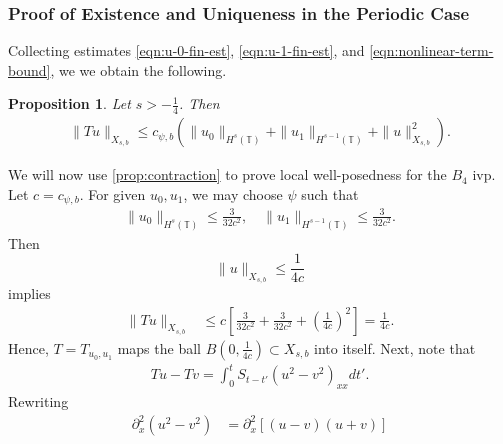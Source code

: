 \documentclass[12pt,reqno]{amsart}
\numberwithin{equation}{section}  %
\numberwithin{figure}{section}
\newcommand{\ci}{\mathbb{T}}
\newcommand{\p}{\partial}
\theoremstyle{plain}
\newtheorem{proposition}{Proposition}
\theoremstyle{definition}
\theoremstyle{remark}
\begin{document}
\subsubsection{Proof of Existence and Uniqueness in the Periodic Case}
\label{sssec:proof-b4-per-case}
%
%
Collecting estimates \eqref{eqn:u-0-fin-est}, \eqref{eqn:u-1-fin-est}, and
\eqref{eqn:nonlinear-term-bound}, we 
we obtain the following.
%
%				 
%
\begin{proposition}
\label{prop:contraction}
Let $s > -\frac{1}{4}$. Then
%
\begin{equation*}
	\begin{split}
    \|Tu\|_{X_{s,b}} \le c_{\psi, b} \left( \|u_0 \|_{H^s(\ci)} + \|u_1 \|_{H^{s-1}(\ci)}
    + \|u\|_{X_{s,b}}^2 
		\right).
	\end{split}
\end{equation*}
%
\end{proposition}
We will now use \autoref{prop:contraction} to prove local well-posedness for the 
$B_4$ ivp. Let $c = c_{\psi, b}$. For given $u_0, u_1$, we may choose $\psi$ such
that 
%
\begin{equation*}
	\begin{split}
    \|u_0\|_{H^s(\ci)} \le \frac{3}{32c^2}, \quad \|u_1\|_{H^{s-1}(\ci)} \le \frac{3}{32c^2}.
	\end{split}
\end{equation*}
%
Then $$\|u\|_{X_{s,b}} \le \frac{1}{4c}$$ implies
%
\begin{equation*}
	\begin{split}
		\|T u \|_{X_{s,b}} 
		& \le c \left[ \frac{3}{32c^2} + \frac{3}{32c^2}+ \left( 
		\frac{1}{4c} \right)^2 \right]
		=  \frac{1}{4c}.
	\end{split}
\end{equation*}
%
Hence, $T=T_{u_0, u_1}$ maps the ball $B\left( 0, \frac{1}{4c} \right) \subset
X_{s,b}$ into itself. Next, note that 
%
\begin{equation*}
	\begin{split}
		Tu - Tv = 
    \int_{0}^{t} S_{t-t'}
    (u^{2} - v^{2})_{xx} dt'.
  \end{split}
  \label{eqn:integral-form-dif}
\end{equation*}
%
Rewriting
%
\begin{equation*}
	\begin{split}
	\p_x^2 (u^2 - v^2)	
		& = \p_x^2[(u-v)(u+v)]
		\end{split}
\end{equation*}
\end{document}

